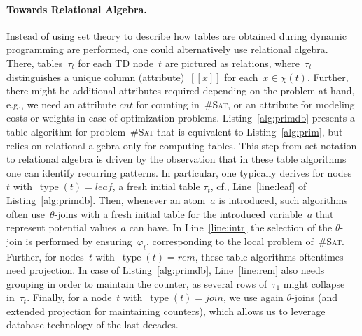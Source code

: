 \documentclass{llncs}
\newcommand{\cid}[1]{\ensuremath{[\![#1]\!]}}
\newcommand{\cSAT}{\textsc{\#Sat}\xspace}%
\newcommand{\tab}[1]{\ensuremath{\tau_{#1}}}
\DeclareMathOperator{\type}{type}
\newcommand{\leaf}{\textit{leaf}}
\newcommand{\rem}{\textit{rem}}
\newcommand{\join}{\textit{join}}
\begin{document}
\paragraph*{Towards Relational Algebra.}
\noindent Instead of using set theory to describe how tables are obtained during dynamic programming 
are performed, one could alternatively use relational algebra. %
There, tables~$\tab{t}$ for each TD node~$t$ are pictured as relations, where~$\tab{t}$ distinguishes a unique column (attribute)~$\cid{x}$ for each~$x\in\chi(t)$.
Further, there might be additional attributes required depending on the problem at hand, e.g., we need an attribute $cnt$ for counting in~\cSAT, or an attribute for modeling costs or weights in case of optimization problems.
Listing~\ref{alg:primdb} presents a table algorithm for problem~\cSAT that is equivalent to Listing~\ref{alg:prim}, but relies on relational algebra only for computing tables.
This step from set notation to relational algebra is driven by the observation that in these table algorithms one can identify recurring patterns.
In particular, one typically derives for nodes~$t$ with~$\type(t)=\leaf$, a fresh initial table $\tab{t}$, cf., Line~\ref{line:leaf} of Listing~\ref{alg:primdb}.
Then, whenever an atom~$a$ is introduced, such algorithms often use~$\theta$-joins with a fresh initial table for the introduced variable~$a$ that represent potential values~$a$ can have. In Line~\ref{line:intr} the selection of the $\theta$-join is performed by ensuring~$\varphi_t$, corresponding to the local problem of~\cSAT.
Further, for nodes~$t$ with~$\type(t)=\rem$, these table algorithms oftentimes need projection. 
In case of Listing~\ref{alg:primdb}, Line~\ref{line:rem} also needs grouping in order to maintain the counter, as several rows of~$\tab{1}$ might collapse in~$\tab{t}$.
Finally, for a node~$t$ with~$\type(t)=\join$, we use again $\theta$-joins (and extended projection for maintaining counters), which allows us to leverage database technology of the last decades.
\end{document}
